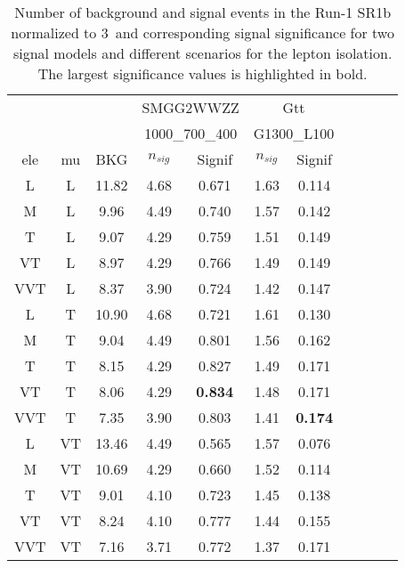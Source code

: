\begin{table}[htb]
\caption{Number of background and signal events in the Run-1 SR1b normalized to 3\ifb\ and corresponding signal significance for two
signal models and different scenarios for the lepton isolation. The largest significance values is highlighted in bold.}
\label{tab:isoOpt2}
\begin{center}
\begin{tabular}{|cc|c|cc|cc|cc|cc|}
\hline
  &  &  & \multicolumn{2}{c|}{SMGG2WWZZ}  & \multicolumn{2}{c|}{Gtt} \\ 
  &  &   & \multicolumn{2}{c|}{1000\_700\_400}  & \multicolumn{2}{c|}{G1300\_L100} \\ \hline
ele  & mu & BKG & $n_{sig}$ & Signif & $n_{sig}$ & Signif \\ \hline
L  & L & 11.82 & 4.68 & 0.671 & 1.63 & 0.114\\  
M  & L & 9.96 & 4.49 & 0.740   & 1.57 & 0.142 \\  
T  & L & 9.07 & 4.29 & 0.759   & 1.51 & 0.149 \\  
VT & L & 8.97 & 4.29 & 0.766   & 1.49 & 0.149 \\  
VVT& L & 8.37 & 3.90 & 0.724   & 1.42 & 0.147 \\  \hline
L  & T & 10.90 & 4.68 & 0.721  & 1.61 & 0.130\\  
M  & T & 9.04 & 4.49 & 0.801   & 1.56 & 0.162 \\  
T  & T & 8.15 & 4.29 & 0.827   & 1.49 & 0.171 \\  
VT & T & 8.06 & 4.29 & \textbf{0.834}   & 1.48 & 0.171 \\  
VVT& T & 7.35 & 3.90 & 0.803   & 1.41 & \textbf{0.174} \\  \hline
L  &VT & 13.46 & 4.49 & 0.565  & 1.57 & 0.076\\  
M  &VT & 10.69 & 4.29 & 0.660  & 1.52 & 0.114\\  
T  &VT & 9.01 & 4.10 & 0.723   & 1.45 & 0.138 \\  
VT &VT & 8.24 & 4.10 & 0.777   & 1.44 & 0.155 \\  
VVT&VT & 7.16 & 3.71 & 0.772   & 1.37 & 0.171 \\ \hline
\end{tabular}
\end{center}
\end{table}

